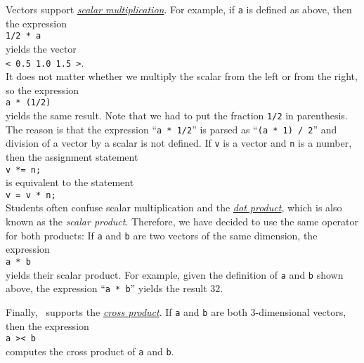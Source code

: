 Vectors support 
\href{http://en.wikipedia.org/wiki/Scalar_multiplication}{\emph{scalar multiplication}}.  For
example, if \texttt{a} is defined as above, then the expression
\\[0.2cm]
\hspace*{1.3cm}
\texttt{1/2 * a}
\\[0.2cm]
yields the vector
\\[0.2cm]
\hspace*{1.3cm}
\texttt{< 0.5  1.0  1.5 >}.
\\[0.2cm]
It does not matter whether we multiply the scalar from the left or from the right, so the expression
\\[0.2cm]
\hspace*{1.3cm}
\texttt{a * (1/2)}
\\[0.2cm]
yields the same result.  Note that we had to put the fraction \texttt{1/2} in parenthesis.  The
reason is that the expression ``\texttt{a * 1/2}'' is parsed as ``\texttt{(a * 1) / 2}'' and
division of a vector by a scalar is not defined.  If \texttt{v} is a vector and \texttt{n} is a
number, then the assignment statement
\\[0.2cm]
\hspace*{1.3cm}
\texttt{v *= n;}
\\[0.2cm]
is equivalent to the statement
\\[0.2cm]
\hspace*{1.3cm}
\texttt{v = v * n;}
\\[0.2cm]
Students often confuse scalar multiplication and the 
\href{http://en.wikipedia.org/wiki/Dot_product}{\emph{dot product}}, which is also known as the
\emph{scalar product}.  Therefore, we have decided to use the same operator for both products:
If \texttt{a} and \texttt{b} are two vectors of the same dimension, the expression
\\[0.2cm]
\hspace*{1.3cm}
\texttt{a * b}
\\[0.2cm]
yields their scalar product.  For example,
given the definition of \texttt{a} and \texttt{b} shown above, the expression
``\texttt{a * b}''
yields the result $32$.

Finally, \setlx\ supports the 
\href{http://en.wikipedia.org/wiki/Cross_product}{\emph{cross product}}.  If \texttt{a} and
\texttt{b} are both 3-dimensional vectors, then the expression
\\[0.2cm]
\hspace*{1.3cm}
\texttt{a >< b}
\\[0.2cm]
computes the cross product of \texttt{a} and \texttt{b}.

